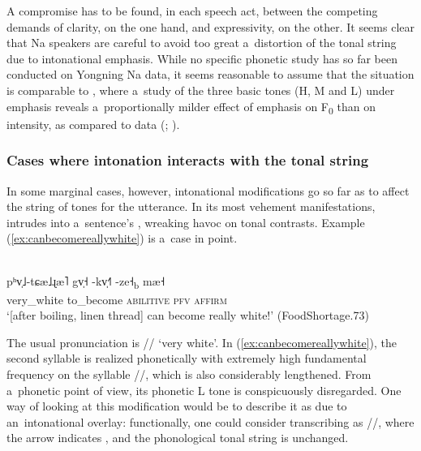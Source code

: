 A compromise has to be found, in each speech act, between the competing demands of clarity, on the
one hand, and expressivity, on the other. It seems clear that Na speakers are careful to avoid too
great a~distortion of the tonal string due to intonational emphasis. While no specific phonetic
study has so far been conducted on Yongning Na data, it seems reasonable to assume that the
situation is comparable to , where a~study of the three basic tones (H, M and L) under emphasis
reveals a~proportionally milder effect of emphasis on F\textsubscript{0} than on
intensity, as compared to  data (\citealt[107–167]{michaud2005}; \citealt{michaudetal2015d}).


\subsubsection{Cases where intonation interacts with the tonal string}
\label{sec:caseswhereintonationinteractswiththetonalstring}

In some marginal cases, however, intonational modifications go so far as to affect the string of tones for
the utterance. In its most vehement manifestations,  intrudes into
a~sentence’s , wreaking havoc on tonal contrasts. Example (\ref{ex:canbecomereallywhite}) is
a~case in point.

\begin{exe}
  \ex
  \label{ex:canbecomereallywhite}
  \\
  \gll pʰv̩˩-tɕæ˩ɻæ˥	gv̩˧	-kv̩˧˥		-ze˧\textsubscript{b}		mæ˧\\
  very\_white	to\_become	\textsc{abilitive}	\textsc{pfv}	\textsc{affirm}\\
  \glt ‘[after boiling, linen thread] can become really white!’ (FoodShortage.73)
\end{exe}

The usual pronunciation is // ‘very white’. In (\ref{ex:canbecomereallywhite}),
the second syllable is realized phonetically with extremely high fundamental frequency on the
syllable //, which is also considerably lengthened. From a~phonetic point of view, its phonetic
L tone is conspicuously disregarded. One way of looking at this modification would be to describe it
as due to an~intonational overlay: functionally, one could consider transcribing as
//, where the arrow  indicates , and the phonological
tonal string is unchanged.

